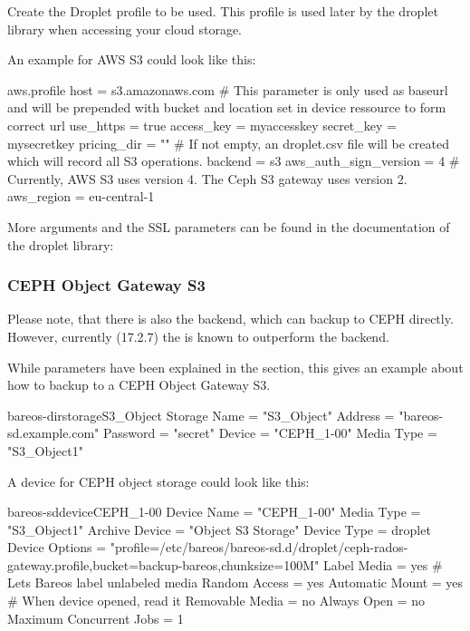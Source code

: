 Create the Droplet profile to be used.
This profile is used later by the droplet library when accessing your cloud storage.

An example for AWS S3 could look like this:

\begin{config}{aws.profile}
host = s3.amazonaws.com         # This parameter is only used as baseurl and will be prepended with bucket and location set in device ressource to form correct url
use_https = true
access_key = myaccesskey
secret_key = mysecretkey
pricing_dir = ""                # If not empty, an droplet.csv file will be created which will record all S3 operations.
backend = s3
aws_auth_sign_version = 4       # Currently, AWS S3 uses version 4. The Ceph S3 gateway uses version 2.
aws_region = eu-central-1
\end{config}


More arguments and the SSL parameters can be found in the documentation of the droplet library:
\externalReferenceDropletDocConfigurationFile


\subsubsection{CEPH Object Gateway S3}

Please note, that there is also the  backend,
which can backup to CEPH directly. However, currently (17.2.7) the  is known to outperform the  backend.

While parameters have been explained in the  section, this gives an example about how to backup to a CEPH Object Gateway S3.

\begin{bareosConfigResource}{bareos-dir}{storage}{S3\_Object}
Storage {
    Name = "S3_Object"
    Address  = "bareos-sd.example.com"
    Password = "secret"
    Device = "CEPH_1-00"
    Media Type = "S3_Object1"
}
\end{bareosConfigResource}


A device for CEPH object storage could look like this:
\begin{bareosConfigResource}{bareos-sd}{device}{CEPH\_1-00}
Device {
  Name = "CEPH_1-00"
  Media Type = "S3_Object1"
  Archive Device = "Object S3 Storage"
  Device Type = droplet
  Device Options = "profile=/etc/bareos/bareos-sd.d/droplet/ceph-rados-gateway.profile,bucket=backup-bareos,chunksize=100M"
  Label Media = yes                    # Lets Bareos label unlabeled media
  Random Access = yes
  Automatic Mount = yes                # When device opened, read it
  Removable Media = no
  Always Open = no
  Maximum Concurrent Jobs = 1
}
\end{bareosConfigResource}

